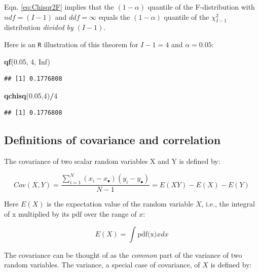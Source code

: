 \documentclass[
]{book}
\newenvironment{Shaded}{\begin{snugshade}}{\end{snugshade}}
\newcommand{\DecValTok}[1]{\textcolor[rgb]{0.00,0.00,0.81}{#1}}
\newcommand{\FloatTok}[1]{\textcolor[rgb]{0.00,0.00,0.81}{#1}}
\newcommand{\KeywordTok}[1]{\textcolor[rgb]{0.13,0.29,0.53}{\textbf{#1}}}
\newcommand{\NormalTok}[1]{#1}
\newcommand{\OperatorTok}[1]{\textcolor[rgb]{0.81,0.36,0.00}{\textbf{#1}}}
\newcommand{\OtherTok}[1]{\textcolor[rgb]{0.56,0.35,0.01}{#1}}
\begin{document}
Eqn. \eqref{eq:Chisqr2F} implies that the \((1-\alpha)\) quantile of the F-distribution with \(ndf=(I-1)\) and \(ddf =\infty\) equals the \((1-\alpha)\) quantile of the \(\chi_{I-1}^2\) distribution \emph{divided by} \((I-1)\).

Here is an \texttt{R} illustration of this theorem for \(I-1 = 4\) and \(\alpha = 0.05\):

\begin{Shaded}
\begin{Highlighting}[]
\KeywordTok{qf}\NormalTok{(}\FloatTok{0.05}\NormalTok{, }\DecValTok{4}\NormalTok{, }\OtherTok{Inf}\NormalTok{)}
\end{Highlighting}
\end{Shaded}

\begin{verbatim}
## [1] 0.1776808
\end{verbatim}

\begin{Shaded}
\begin{Highlighting}[]
\KeywordTok{qchisq}\NormalTok{(}\FloatTok{0.05}\NormalTok{,}\DecValTok{4}\NormalTok{)}\OperatorTok{/}\DecValTok{4}
\end{Highlighting}
\end{Shaded}

\begin{verbatim}
## [1] 0.1776808
\end{verbatim}

\hypertarget{or-method-intro-elementary-stats-def-cov-matrix}{%
\subsection{Definitions of covariance and correlation}\label{or-method-intro-elementary-stats-def-cov-matrix}}

The covariance of two scalar random variables X and Y is defined by:

\begin{equation}
Cov(X,Y) =\frac{\sum_{i=1}^{N}(x_{i}-x_{\bullet})(y_{i}-y_{\bullet})}{N-1}=E(XY)-E(X)-E(Y)
\label{eq:DefCov}
\end{equation}

Here \(E(X)\) is the expectation value of the random variable \(X\), i.e., the integral of x multiplied by its \(\text{pdf}\) over the range of \(x\):

\[E(X)=\int \text{pdf(x)} x dx\]

The covariance can be thought of as the \emph{common} part of the variance of two random variables. The variance, a special case of covariance, of \(X\) is defined by:
\end{document}
